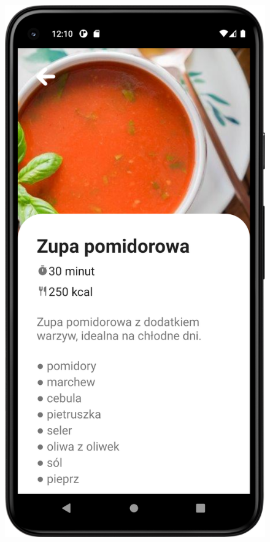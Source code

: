 \documentclass{article}
\begin{document}
\begin{enumerate}
\begin{enumerate}
\begin{figure}[ht]
\begin{minipage}[b]{0.4\textwidth}
    \end{minipage}%
    \begin{minipage}[b]{0.4\textwidth}
        \centering
        \includegraphics[width=\textwidth]{../res/phone_recipe_detail}
    \end{minipage}
\end{figure}


\end{enumerate}
\end{enumerate}
\end{document}
